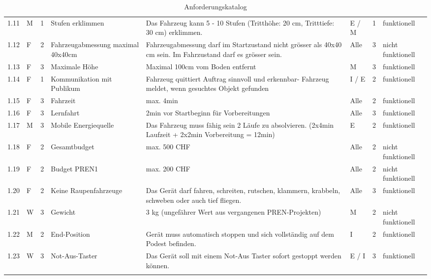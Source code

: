 \begin{longtable}[]{@{}lllp{2cm}p{5cm}llp{2cm}@{}}
1.11 & M & 1 & Stufen erklimmen & Das Fahrzeug kann 5 - 10 Stufen
(Tritthöhe: 20 cm, Tritttiefe: 30 cm) erklimmen. & E / M & 1 &
funktionell\tabularnewline

1.12 & F & 2 & Fahrzeugabmessung maximal 40x40cm & Fahrzeugabmessung darf
im Startzustand nicht grösser als 40x40 cm sein. Im Fahrzustand darf es
grösser sein. & Alle & 3 & nicht \hbox{funktionell}\tabularnewline

1.13 & F & 3 & Maximale Höhe & Maximal 100cm vom Boden entfernt & M & 3
& funktionell\tabularnewline

1.14 & F & 1 & Kommunikation mit Publikum &
Fahrzeug quittiert Auftrag sinnvoll und
erkennbar- Fahrzeug meldet, wenn gesuchtes Objekt
gefunden & I / E & 2 & funktionell\tabularnewline

1.15 & F & 3 & Fahrzeit & max. 4min & Alle & 2 &
funktionell\tabularnewline

1.16 & F & 3 & Lernfahrt & 2min vor Startbeginn für Vorbereitungen &
Alle & 3 & funktionell\tabularnewline

1.17 & M & 3 & Mobile Energiequelle & Das Fahrzeug muss fähig sein 2
Läufe zu absolvieren. (2x4min Laufzeit + 2x2min Vorbereitung = 12min) & E &
2 & funktionell\tabularnewline

1.18 & F & 2 & Gesamtbudget & max. 500 CHF & Alle & 2 & nicht
\hbox{funktionell}\tabularnewline

1.19 & F & 2 & Budget PREN1 & max. 200 CHF & Alle & 2 & nicht
\hbox{funktionell}\tabularnewline

1.20 & F & 2 & Keine Raupenfahrzeuge & Das Gerät darf fahren, schreiten,
rutschen, klammern, krabbeln, schweben oder auch tief fliegen. & Alle &
3 & funktionell\tabularnewline

1.21 & W & 3 & Gewicht & 3 kg (ungefährer Wert aus vergangenen
PREN-Projekten) & M & 2 & nicht \hbox{funktionell}\tabularnewline

1.22 & M & 2 & End-Position & Gerät muss automatisch stoppen und sich
vollständig auf dem Podest befinden. & I & 2 &
funktionell\tabularnewline

1.23 & W & 3 & Not-Aus-Taster & Das Gerät soll mit einem Not-Aus Taster
sofort gestoppt werden können. & E / I & 3 & funktionell\tabularnewline
\caption{Anforderungskatalog}
\end{longtable}
\normalsize
